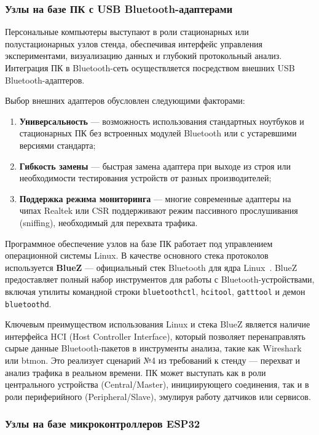 \subsubsection{Узлы на базе ПК с USB Bluetooth-адаптерами}

Персональные компьютеры выступают в роли стационарных или полустационарных узлов стенда, обеспечивая интерфейс управления экспериментами, визуализацию данных и глубокий протокольный анализ. Интеграция ПК в Bluetooth-сеть осуществляется посредством внешних USB Bluetooth-адаптеров.

Выбор внешних адаптеров обусловлен следующими факторами:
\begin{enumerate}[nosep]
    \item \textbf{Универсальность} --- возможность использования стандартных ноутбуков и стационарных ПК без встроенных модулей Bluetooth или с устаревшими версиями стандарта;
    \item \textbf{Гибкость замены} --- быстрая замена адаптера при выходе из строя или необходимости тестирования устройств от разных производителей;
    \item \textbf{Поддержка режима мониторинга} --- многие современные адаптеры на чипах Realtek или CSR поддерживают режим пассивного прослушивания (sniffing), необходимый для перехвата трафика.
\end{enumerate}

Программное обеспечение узлов на базе ПК работает под управлением операционной системы Linux. В качестве основного стека протоколов используется \textbf{BlueZ} --- официальный стек Bluetooth для ядра Linux~\cite{bluez_stack}. BlueZ предоставляет полный набор инструментов для работы с Bluetooth-устройствами, включая утилиты командной строки \texttt{bluetoothctl}, \texttt{hcitool}, \texttt{gatttool} и демон \texttt{bluetoothd}.

Ключевым преимуществом использования Linux и стека BlueZ является наличие интерфейса HCI (Host Controller Interface), который позволяет перенаправлять сырые данные Bluetooth-пакетов в инструменты анализа, такие как Wireshark или btmon. Это реализует сценарий №4 из требований к стенду --- перехват и анализ трафика в реальном времени. ПК может выступать как в роли центрального устройства (Central/Master), инициирующего соединения, так и в роли периферийного (Peripheral/Slave), эмулируя работу датчиков или сервисов.

\subsubsection{Узлы на базе микроконтроллеров ESP32}

